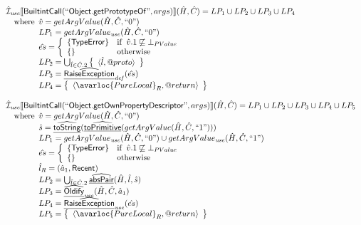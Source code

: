 \[\begin{array}{l}
\end{array}
\]
\[
\begin{array}{l}
\aI_{\it use}\lbr \SF{BuiltintCall}(``\SF{Object.getPrototypeOf}",args)\rbr(\hat{H},\hat{C}) = LP_1 \cup LP_2 \cup LP_3 \cup LP_4\\
\quad\wherec{
  \hat{v} = getArgValue(\hat{H}, \hat{C}, ``0")\\
  LP_1 =  getArgValue_{\it use}(\hat{H}, \hat{C}, ``0")\\
  \hat{es} = \left\{\begin{array}{ll}
      \{ \SF{TypeError} \}
      & \ifc{\hat{v}.1 \not\sqsubseteq \bot_{PValue}}\\
      \set{} & \owc
    \end{array}\right.\\
  LP_2 =  \bigcup_{\hat{l} \in \hat{C}.2} \set{\langle \hat{l},\varprop{proto} \rangle}\\
  LP_3 = \ahf{RaiseException}_{\it def}(\hat{es})\\
  LP_4 = \set{\langle\avarloc{PureLocal}_R,\varprop{return}\rangle}\\
  }\\
\\

\aI_{\it use}\lbr \SF{BuiltintCall}(``\SF{Object.getOwnPropertyDescriptor}",args)\rbr(\hat{H},\hat{C}) = LP_1 \cup LP_2 \cup LP_3 \cup LP_4 \cup LP_5\\
\quad\wherec{
  \hat{v} = getArgValue(\hat{H}, \hat{C}, ``0")\\
  \hat{s} = \ahf{toString}(\ahf{toPrimitive}(getArgValue(\hat{H}, \hat{C}, ``1")))\\
  LP_1 =  getArgValue_{\it use}(\hat{H}, \hat{C}, ``0") \cup  getArgValue_{\it use}(\hat{H}, \hat{C}, ``1")\\
  \hat{es} = \left\{\begin{array}{ll}
      \{ \SF{TypeError} \}
      & \ifc{\hat{v}.1 \not\sqsubseteq \bot_{PValue}}\\
      \set{} & \owc
    \end{array}\right.\\
  \hat{l}_R = (\hat{a}_1, \SF{Recent})\\
  LP_2 =  \bigcup_{\hat{l} \in \hat{C}.2} \ahf{absPair}(\hat{H}, \hat{l}, \hat{s})\\
  LP_3 = \ahf{Oldify}_{\it use}(\hat{H}, \hat{C}, \hat{a}_1)\\
  LP_4 = \ahf{RaiseException}_{\it use}(\hat{es})\\
  LP_5 = \set{\langle\avarloc{PureLocal}_R,\varprop{return}\rangle}\\
  }\\
\\


\end{array}\]
